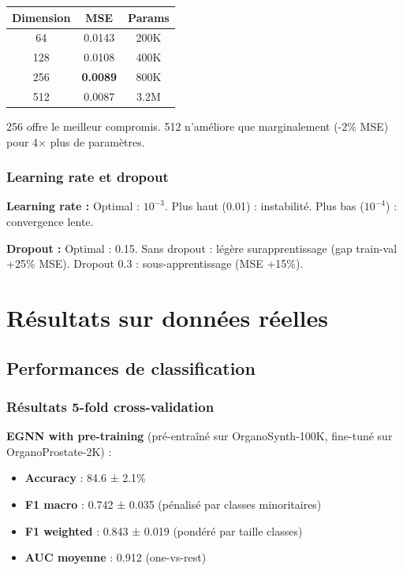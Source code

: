 \begin{center}
\begin{tabular}{|c|c|c|}
\hline
\textbf{Dimension} & \textbf{MSE} & \textbf{Params} \\
\hline
64 & 0.0143 & 200K \\
128 & 0.0108 & 400K \\
256 & \textbf{0.0089} & 800K \\
512 & 0.0087 & 3.2M \\
\hline
\end{tabular}
\end{center}

256 offre le meilleur compromis. 512 n'améliore que marginalement (-2\% MSE) pour 4× plus de paramètres.

\subsubsection{Learning rate et dropout}

\textbf{Learning rate :}
Optimal : $10^{-3}$. Plus haut (0.01) : instabilité. Plus bas ($10^{-4}$) : convergence lente.

\textbf{Dropout :}
Optimal : 0.15. Sans dropout : légère surapprentissage (gap train-val +25\% MSE). Dropout 0.3 : sous-apprentissage (MSE +15\%).

\section{Résultats sur données réelles}

\subsection{Performances de classification}

\subsubsection{Résultats 5-fold cross-validation}

\textbf{EGNN with pre-training} (pré-entraîné sur OrganoSynth-100K, fine-tuné sur OrganoProstate-2K) :
\begin{itemize}
    \item \textbf{Accuracy} : 84.6 ± 2.1\%
    \item \textbf{F1 macro} : 0.742 ± 0.035 (pénalisé par classes minoritaires)
    \item \textbf{F1 weighted} : 0.843 ± 0.019 (pondéré par taille classes)
    \item \textbf{AUC moyenne} : 0.912 (one-vs-rest)
\end{itemize}


